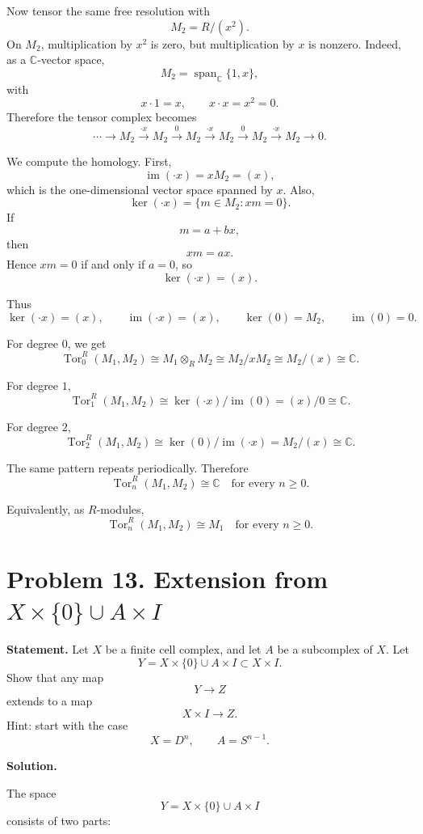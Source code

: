 \documentclass[12pt,a4paper]{article}
\theoremstyle{notespace}
\begin{document}
Now tensor the same free resolution with
\[
M_2=R/(x^2).
\]
On \(M_2\), multiplication by \(x^2\) is zero, but multiplication by \(x\) is nonzero. Indeed, as a \(\mathbb C\)-vector space,
\[
M_2=\operatorname{span}_{\mathbb C}\{1,x\},
\]
with
\[
x\cdot 1=x,\qquad x\cdot x=x^2=0.
\]
Therefore the tensor complex becomes
\[
\cdots
\longrightarrow
M_2
\xrightarrow{\cdot x}
M_2
\xrightarrow{0}
M_2
\xrightarrow{\cdot x}
M_2
\xrightarrow{0}
M_2
\xrightarrow{\cdot x}
M_2
\longrightarrow
0.
\]

We compute the homology. First,
\[
\operatorname{im}(\cdot x)=xM_2=(x),
\]
which is the one-dimensional vector space spanned by \(x\). Also,
\[
\ker(\cdot x)=\{m\in M_2:xm=0\}.
\]
If
\[
m=a+bx,
\]
then
\[
xm=ax.
\]
Hence \(xm=0\) if and only if \(a=0\), so
\[
\ker(\cdot x)=(x).
\]

Thus
\[
\ker(\cdot x)=(x),
\qquad
\operatorname{im}(\cdot x)=(x),
\qquad
\ker(0)=M_2,
\qquad
\operatorname{im}(0)=0.
\]

For degree \(0\), we get
\[
\operatorname{Tor}^R_0(M_1,M_2)
\cong
M_1\otimes_R M_2
\cong
M_2/xM_2
\cong
M_2/(x)
\cong
\mathbb C.
\]

For degree \(1\),
\[
\operatorname{Tor}^R_1(M_1,M_2)
\cong
\ker(\cdot x)/\operatorname{im}(0)
=
(x)/0
\cong
\mathbb C.
\]

For degree \(2\),
\[
\operatorname{Tor}^R_2(M_1,M_2)
\cong
\ker(0)/\operatorname{im}(\cdot x)
=
M_2/(x)
\cong
\mathbb C.
\]

The same pattern repeats periodically. Therefore
\[
\boxed{
	\operatorname{Tor}^R_n(M_1,M_2)\cong \mathbb C
	\quad \text{for every } n\geq 0.
}
\]

Equivalently, as \(R\)-modules,
\[
\boxed{
	\operatorname{Tor}^R_n(M_1,M_2)\cong M_1
	\quad \text{for every } n\geq 0.
}
\]


\section{Problem 13. Extension from \(X\times\{0\}\cup A\times I\)}

\textbf{Statement.}
Let \(X\) be a finite cell complex, and let \(A\) be a subcomplex of \(X\). Let
\[
Y=X\times\{0\}\cup A\times I
\subset X\times I.
\]
Show that any map
\[
Y\longrightarrow Z
\]
extends to a map
\[
X\times I\longrightarrow Z.
\]
Hint: start with the case
\[
X=D^n,\qquad A=S^{n-1}.
\]

\textbf{Solution.}

The space
\[
Y=X\times\{0\}\cup A\times I
\]
consists of two parts:
\end{document}
